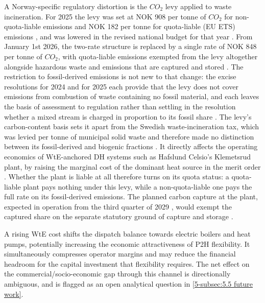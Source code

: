 A Norway-specific regulatory distortion is the $CO_2$ levy applied to waste incineration. For 2025 the levy was set at NOK 908 per tonne of $CO_2$ for non-quota-liable emissions and NOK 182 per tonne for quota-liable (EU ETS) emissions \cite{stortinget_avfallsforbrenning_2025}, and was lowered in the revised national budget for that year \cite{hafslund_arsrapport_nodate}. From January 1st 2026, the two-rate structure is replaced by a single rate of NOK 848 per tonne of $CO_2$, with quota-liable emissions exempted from the levy altogether alongside hazardous waste and emissions that are captured and stored \cite{stortinget_stortingsvedtak_2025}. The restriction to fossil-derived emissions is not new to that change: the excise resolutions for 2024 and for 2025 each provide that the levy does not cover emissions from combustion of waste containing no fossil material, and each leaves the basis of assessment to regulation rather than settling in the resolution whether a mixed stream is charged in proportion to its fossil share \cite{stortinget_stortingsvedtak_nodate}. The levy's carbon-content basis sets it apart from the Swedish waste-incineration tax, which was levied per tonne of municipal solid waste and therefore made no distinction between its fossil-derived and biogenic fractions \cite{monie_power--heat_2022}. It directly affects the operating economics of WtE-anchored DH systems such as Hafslund Celsio's Klemetsrud plant, by raising the marginal cost of the dominant heat source in the merit order \cite{hafslund_arsrapport_nodate}. Whether the plant is liable at all therefore turns on its quota status: a quota-liable plant pays nothing under this levy, while a non-quota-liable one pays the full rate on its fossil-derived emissions. The planned carbon capture at the plant, expected in operation from the third quarter of 2029 \cite{hafslund_arsrapport_nodate}, would exempt the captured share on the separate statutory ground of capture and storage \cite{stortinget_stortingsvedtak_2025}.

A rising WtE cost shifts the dispatch balance towards electric boilers and heat pumps, potentially increasing the economic attractiveness of P2H flexibility. It simultaneously compresses operator margins and may reduce the financial headroom for the capital investment that flexibility requires. The net effect on the commercial/socio-economic gap through this channel is directionally ambiguous, and is flagged as an open analytical question in \autoref{5-subsec:5.5 future work}.

